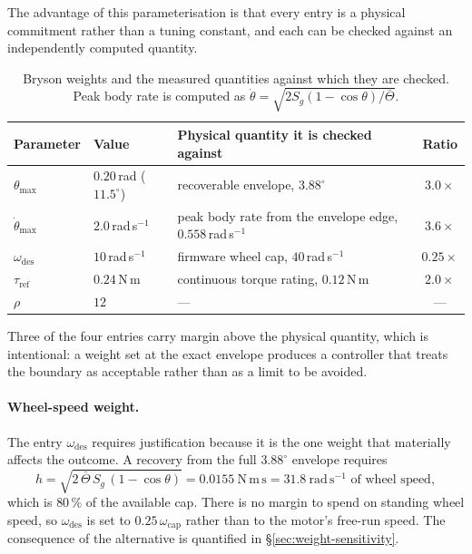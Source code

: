 The advantage of this parameterisation is that every entry is a physical
commitment rather than a tuning constant, and each can be checked against an
independently computed quantity.

\begin{table}[htbp]
\centering
\small
\begin{tabular}{@{}lllc@{}}
\toprule
\textbf{Parameter} & \textbf{Value} & \textbf{Physical quantity it is checked against} & \textbf{Ratio}\\
\midrule
$\theta_{\max}$ & $0.20$\,rad ($11.5^\circ$)
  & recoverable envelope, $3.88^\circ$ & $3.0\times$\\
$\dot\theta_{\max}$ & $2.0$\,rad\,s$^{-1}$
  & peak body rate from the envelope edge, $0.558$\,rad\,s$^{-1}$ & $3.6\times$\\
$\omega_{\mathrm{des}}$ & $10$\,rad\,s$^{-1}$
  & firmware wheel cap, $40$\,rad\,s$^{-1}$ & $0.25\times$\\
$\tau_{\mathrm{ref}}$ & $0.24$\,N\,m
  & continuous torque rating, $0.12$\,N\,m & $2.0\times$\\
$\rho$ & $12$ & --- & ---\\
\bottomrule
\end{tabular}
\caption{Bryson weights and the measured quantities against which they are
checked. Peak body rate is computed as
$\dot\theta = \sqrt{2 S_g (1-\cos\theta)/\bar\Theta}$.}
\label{tab:bryson}
\end{table}

Three of the four entries carry margin above the physical quantity, which is
intentional: a weight set at the exact envelope produces a controller that
treats the boundary as acceptable rather than as a limit to be avoided.

\paragraph{Wheel-speed weight.} The entry $\omega_{\mathrm{des}}$ requires
justification because it is the one weight that materially affects the
outcome. A recovery from the full $3.88^\circ$ envelope requires
%
\begin{equation}
  h = \sqrt{2\,\bar\Theta\,S_g\,(1-\cos\theta)} = 0.0155\ \mathrm{N\,m\,s}
    = 31.8\ \mathrm{rad\,s^{-1}} \text{ of wheel speed},
\end{equation}
%
which is $80\,\%$ of the available cap. There is no margin to spend on
standing wheel speed, so $\omega_{\mathrm{des}}$ is set to
$0.25\,\omega_{\mathrm{cap}}$ rather than to the motor's free-run speed. The
consequence of the alternative is quantified in \S\ref{sec:weight-sensitivity}.

